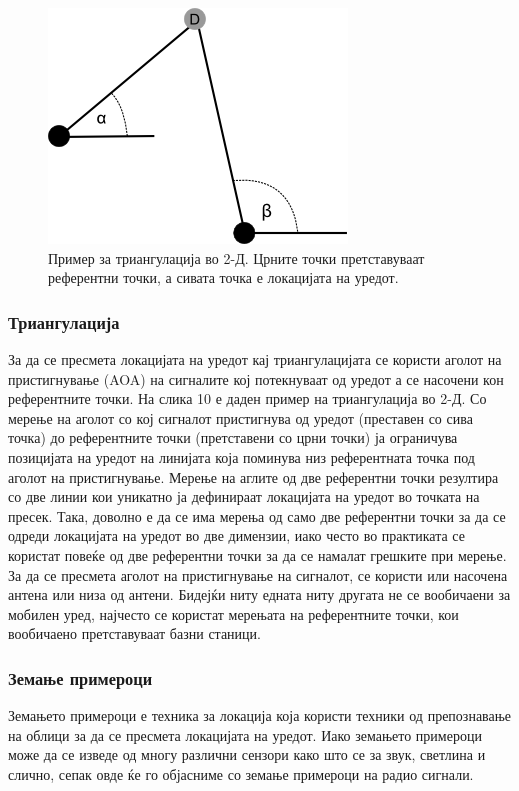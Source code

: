 \begin{figure}[htb]
\centering
\includegraphics[scale=0.4]{images/triangulation}
\caption{Пример за триангулација во 2-Д. Црните точки претставуваат референтни
точки, а сивата точка е локацијата на уредот.}
\label{fig:triangulation}
\end{figure}

\subsubsection{Триангулација}

 За да се пресмета локацијата на уредот кај триангулацијата се
користи аголот на пристигнување (AOA) на сигналите кој потекнуваат од уредот а
се насочени кон референтните точки. На слика 10 е даден пример на триангулација
во 2-Д. Со мерење на аголот со кој сигналот пристигнува од уредот (преставен со
сива точка) до референтните точки (претставени со црни точки) ја ограничува
позицијата на уредот на линијата која поминува низ референтната точка под аголот
на пристигнување. Мерење на аглите од две референтни точки резултира со две
линии кои уникатно ја дефинираат локацијата на уредот во точката на пресек.
Така, доволно е да се има мерења од само две референтни точки за да се одреди
локацијата на уредот во две димензии, иако често во практиката се користат
повеќе од две референтни точки за да се намалат грешките при мерење. 
За да се
пресмета аголот на пристигнување на сигналот, се користи или насочена антена или
низа од антени. Бидејќи ниту едната ниту другата не се вообичаени за мобилен
уред, најчесто се користат мерењата на референтните точки, кои вообичаено
претставуваат базни станици. 

\subsubsection{Земање примероци} 

Земањето примероци е техника за
локација која користи техники од препознавање на облици за да се пресмета
локацијата на уредот. Иако земањето примероци може да се изведе од многу
различни сензори како што се за звук, светлина и слично, сепак овде ќе го
објасниме со земање примероци на радио сигнали. 

